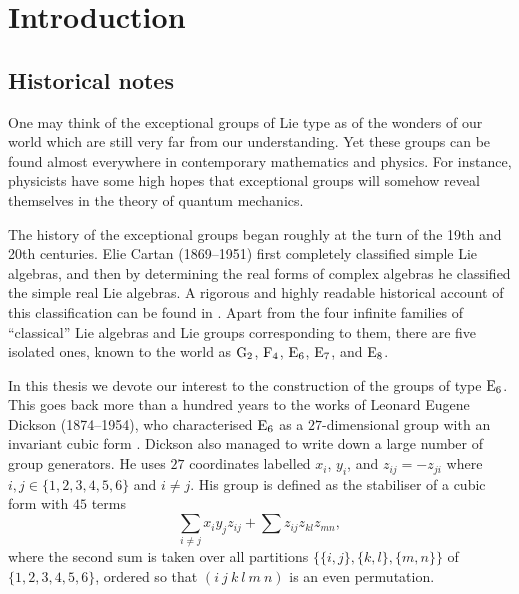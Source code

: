 \chapter{Introduction}
\ifpdf
    \graphicspath{{Introduction/IntroductionFigs/PNG/}{Introduction/IntroductionFigs/PDF/}{Introduction/IntroductionFigs/}}
\else
    \graphicspath{{Introduction/IntroductionFigs/EPS/}{Introduction/IntroductionFigs/}}
\fi
\label{Intro}

\section{Historical notes}

One may think of the exceptional groups of Lie type 
as of the wonders of our
world which are still very far from our understanding. Yet these
groups can be found almost everywhere in contemporary mathematics
and physics. For instance, physicists have some high hopes that
exceptional groups will somehow reveal themselves in the theory
of quantum mechanics. 

The history of the exceptional groups began roughly at the turn
of the 19th and 20th centuries. Elie Cartan (1869--1951)
first completely classified simple Lie algebras, and then by 
determining the real forms of complex algebras he classified the
simple real Lie algebras. A rigorous and highly readable historical
account of this classification can be found in 
\cite{HawkinsThomas}. Apart from the four infinite families
of ``classical'' Lie algebras and Lie groups corresponding to
them, there are five isolated ones, known to the world as
$\mathrm{G}_2$, $\mathrm{F}_4$, $\mathrm{E}_6$, $\mathrm{E}_7$, and $\mathrm{E}_8$.

In this thesis we devote our interest to the construction of the
groups of type $\mathrm{E}_6$. This goes back more than a hundred years
to the works of Leonard Eugene Dickson (1874--1954),
who characterised $\mathrm{E}_6$ as a $27$-dimensional group with an
invariant cubic form \cite{Dickson1, Dickson2}. 
Dickson also managed to write down a 
large number of group generators. He uses $27$ coordinates
labelled $x_i$, $y_i$, and $z_{ij} = -z_{ji}$ where 
$i,j \in \{1,2,3,4,5,6\}$ and $i \neq j$. His group is defined
as the stabiliser of a cubic form with $45$ terms
\begin{equation}
	\sum\limits_{i \neq j} x_i y_j z_{ij} + 
	\sum z_{ij} z_{kl} z_{mn},
\end{equation}
where the second sum is taken over all partitions 
$\{\{i, j\}, \{k, l\}, \{m, n\}\}$ of 
$\{1,2,3,4,5,6\}$, ordered so that $(i\ j\ k\ l\ m\ n)$ is 
an even permutation.

